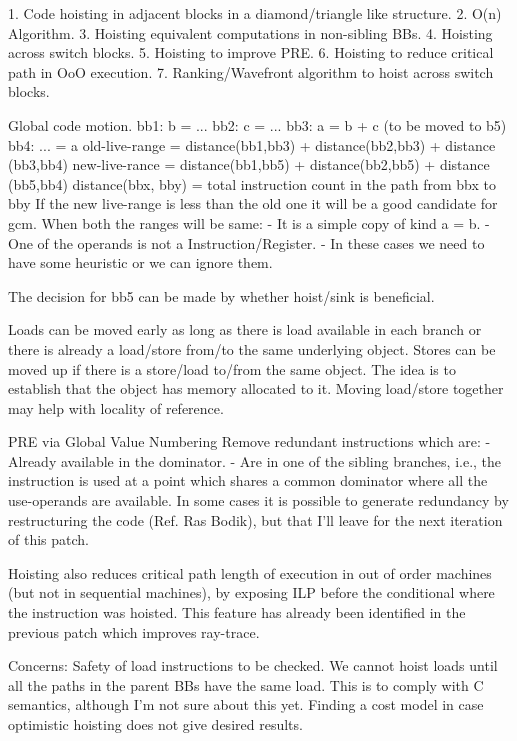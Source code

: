 \begin{section}

1. Code hoisting in adjacent blocks in a diamond/triangle like structure.
2. O(n) Algorithm.
3. Hoisting equivalent computations in non-sibling BBs.
4. Hoisting across switch blocks.
5. Hoisting to improve PRE.
6. Hoisting to reduce critical path in OoO execution.
7. Ranking/Wavefront algorithm to hoist across switch blocks.

Global code motion.
 bb1: b = ...
 bb2: c = ...
 bb3: a = b + c (to be moved to b5)
 bb4: ... = a
 old-live-range = distance(bb1,bb3) + distance(bb2,bb3) + distance (bb3,bb4)
 new-live-rance = distance(bb1,bb5) + distance(bb2,bb5) + distance (bb5,bb4)
 distance(bbx, bby) = total instruction count in the path from bbx to bby
 If the new live-range is less than the old one it will be a good candidate
 for gcm. When both the ranges will be same:
  - It is a simple copy of kind a = b.
  - One of the operands is not a Instruction/Register.
  - In these cases we need to have some heuristic or we can ignore them.

 The decision for bb5 can be made by whether hoist/sink is beneficial.

 Loads can be moved early as long as there is load available in each branch
 or there is already a load/store from/to the same underlying object.
 Stores can be moved up if there is a store/load to/from the same object.
 The idea is to establish that the object has memory allocated to it.
 Moving load/store together may help with locality of reference.

 PRE via Global Value Numbering
 Remove redundant instructions which are:
  - Already available in the dominator.
  - Are in one of the sibling branches, i.e., the instruction is used at
    a point which shares a common dominator where all the use-operands
    are available.
 In some cases it is possible to generate redundancy by restructuring the code
 (Ref. Ras Bodik), but that I'll leave for the next iteration of this patch.


 Hoisting also reduces critical path length of execution in out of order machines (but not in sequential machines), by exposing ILP before the conditional where the instruction was hoisted. This feature has already been identified in the previous patch which improves ray-trace.
  
 Concerns:
 Safety of load instructions to be checked. We cannot hoist loads until all the paths in the parent BBs have the same load. This is to comply with C semantics, although I'm not sure about this yet.
 Finding a cost model in case optimistic hoisting does not give desired results.


\end{section}
